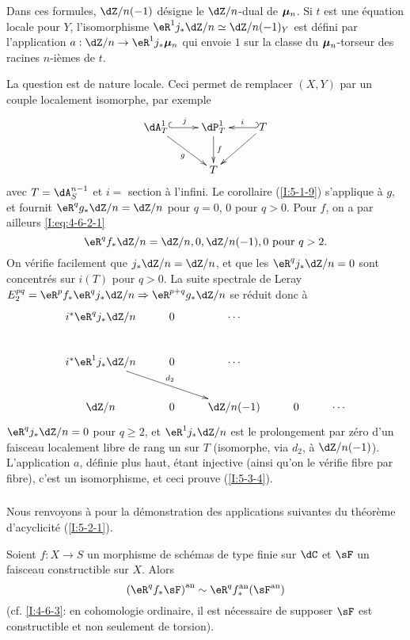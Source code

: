 Dans ces formules, $\dZ/n(-1)$ désigne le $\dZ/n$-dual de ${\bm\mu}_n$. Si $t$ 
est une équation locale pour $Y$, l'isomorphisme 
$\eR^1j_*\dZ/n\simeq\dZ/n(-1)_Y$ est défini par l'application 
$a:\dZ/n\to \eR^1j_*\dmu_n$ qui envoie $1$ sur la classe du ${\bm\mu}_n$-torseur des 
racines $n$-ièmes de $t$. 

La question est de nature locale. Ceci permet de remplacer $(X,Y)$ par un 
couple localement isomorphe, par exemple 
\[\xymatrix{
  \dA_T^1 \ar@{^{(}->}[r]^-j \ar[dr]_-g 
    & \dP_T^1 \ar[d]^-f 
    & \ar@{_{(}->}[l]_-i T \ar[dl] \\
  & T
}\]
avec $T=\dA_S^{n-1}$ et $i=$ section à l'infini. Le corollaire (\ref{I:5-1-9}) 
s'applique à $g$, et fournit $\eR^q g_* \dZ/n=\dZ/n$ pour $q=0$, $0$ pour $q>0$. 
Pour $f$, on a par ailleurs \eqref{I:eq:4-6-2-1}
\[
  \eR^q f_* \dZ/n = \dZ/n,0,\dZ/n(-1),0 \text{ pour $q>2$.}
\]
On vérifie facilement que $j_* \dZ/n = \dZ/n$, et que les $\eR^q j_*\dZ/n = 0$ 
sont concentrés sur $i(T)$ pour $q>0$. La suite spectrale de Leray 
$E_2^{pq} = \eR^p f_* \eR^q j_*\dZ/n \Rightarrow \eR^{p+q}g_* \dZ/n$ se réduit 
donc à 
\[\xymatrix{
  i^* \eR^q j_* \dZ/n & 0 & \cdots \\
  i^* \eR^1 j_* \dZ/n \ar[drr]^-{d_2} & 0 & \cdots \\
  \dZ/n              & 0 & \dZ/n(-1) & 0 & \cdots
}\]
$\eR^q j_*\dZ/n=0$ pour $q\geqslant 2$, et $\eR^1 j_*\dZ/n$ est le prolongement 
par zéro d'un faisceau localement libre de rang un sur $T$ (isomorphe, via 
$d_2$, à $\dZ/n(-1)$). L'application $a$, définie plus haut, étant 
injective (ainsi qu'on le vérifie fibre par fibre), c'est un isomorphisme, et 
ceci prouve (\ref{I:5-3-4}). 





\subsubsection{}\label{I:5-3-5}

Nous renvoyons à \cite[XVI.4,5]{sga4} pour la démonstration des 
applications suivantes du théorème d'acyclicité (\ref{I:5-2-1}). 





\begin{theorem}\label{I:5-3-6} %
Soient $f:X\to S$ un morphisme de schémas de type finie sur $\dC$ et $\sF$ un 
faisceau constructible sur $X$. Alors 
\[
  \an{(\eR^q f_*\sF)} \sim \eR^q \an f_* (\an\sF)
\]
(cf. \ref{I:4-6-3}: en cohomologie ordinaire, il est nécessaire de supposer 
$\sF$ est constructible et non seulement de torsion). 
\end{theorem}





